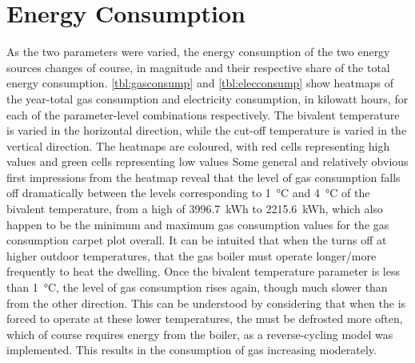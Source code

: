 \section{Energy Consumption}
As the two parameters were varied, the energy consumption of the two energy sources changes of course, in magnitude and their respective share of the total energy consumption. \cref{tbl:gasconsump} and \cref{tbl:elecconsump} show heatmaps of the year-total gas consumption and electricity consumption, in kilowatt hours, for each of the parameter-level combinations respectively. The bivalent temperature is varied in the horizontal direction, while the cut-off temperature is varied in the vertical direction. The heatmaps are coloured, with red cells representing high values and green cells representing low values Some general and relatively obvious first impressions from the heatmap reveal that the level of gas consumption falls off dramatically between the levels corresponding to \qty{1}{\celsius} and \qty{4}{\celsius} of the bivalent temperature, from a high of \qty{3996.7}{\kWh} to \qty{2215.6}{\kWh}, which also happen to be the minimum and maximum gas consumption values for the gas consumption carpet plot overall. It can be intuited that when the \HP turns off at higher outdoor temperatures, that the gas boiler must operate longer/more frequently to heat the dwelling. Once the bivalent temperature parameter is less than \qty{1}{\celsius}, the level of gas consumption rises again, though much slower than from the other direction. This can be understood by considering that when the \HP is forced to operate at these lower temperatures, the \HP must be defrosted more often, which of course requires energy from the boiler, as a reverse-cycling model was implemented. This results in the consumption of gas increasing moderately. 



\begin{table}[htb]
    \footnotesize
    \centering
    \caption{Year-total gas consumption carpet plot for each parameter-level combination $\left[\unit{\kWh\per\year}\right]$}
    \label{tbl:gasconsump}
\end{table}

